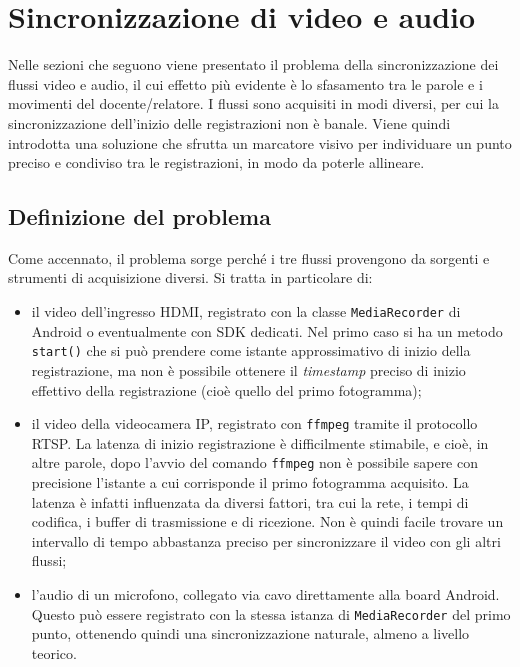 \chapter{Sincronizzazione di video e audio}
\label{cha:sync}

Nelle sezioni che seguono viene presentato il problema della sincronizzazione dei flussi video e audio, il cui effetto più evidente è lo sfasamento tra le parole e i movimenti del docente/relatore. I flussi sono acquisiti in modi diversi, per cui la sincronizzazione dell'inizio delle registrazioni non è banale. Viene quindi introdotta una soluzione che sfrutta un marcatore visivo per individuare un punto preciso e condiviso tra le registrazioni, in modo da poterle allineare.

\section{Definizione del problema}
\label{sec:sync_problema}

Come accennato, il problema sorge perché i tre flussi provengono da sorgenti e strumenti di acquisizione diversi. Si tratta in particolare di:

\begin{itemize}
	\item il video dell'ingresso HDMI, registrato con la classe \texttt{MediaRecorder} di Android o eventualmente con SDK dedicati. Nel primo caso si ha un metodo \texttt{start()} che si può prendere come istante approssimativo di inizio della registrazione, ma non è possibile ottenere il \emph{timestamp} preciso di inizio effettivo della registrazione (cioè quello del primo fotogramma);
	\item il video della videocamera IP, registrato con \texttt{ffmpeg} tramite il protocollo RTSP. La latenza di inizio registrazione è difficilmente stimabile, e cioè, in altre parole, dopo l'avvio del comando \texttt{ffmpeg} non è possibile sapere con precisione l'istante a cui corrisponde il primo fotogramma acquisito. La latenza è infatti influenzata da diversi fattori, tra cui la rete, i tempi di codifica, i buffer di trasmissione e di ricezione. Non è quindi facile trovare un intervallo di tempo abbastanza preciso per sincronizzare il video con gli altri flussi;
	\item l'audio di un microfono, collegato via cavo direttamente alla board Android. Questo può essere registrato con la stessa istanza di \texttt{MediaRecorder} del primo punto, ottenendo quindi una sincronizzazione naturale, almeno a livello teorico.
\end{itemize}

